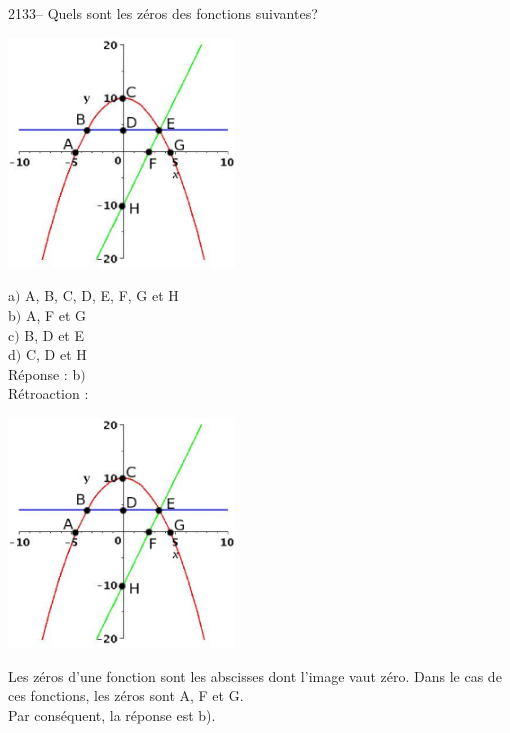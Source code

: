 \documentclass[letterpaper, 12pt]{article}
\begin{document}
2133--  Quels sont les z\'eros des fonctions suivantes?\\
\begin{center}
 \includegraphics[width=6cm,bb=14 14 415 415]{Q2133.eps}
\end{center}

a$)$ A, B, C, D, E, F, G et H\\
b$)$ A, F et G\\
c$)$ B, D et E\\
d$)$ C, D et H\\

R\'eponse : b$)$\\

R\'etroaction :\\
\begin{center}
 \includegraphics[width=6cm,bb=14 14 415 415]{Q2133.eps}
\end{center}
Les z\'eros d'une fonction sont les abscisses dont l'image vaut z\'ero. Dans le cas de ces fonctions, les z\'eros sont A, F et G.\\
Par cons\'equent, la r\'eponse est b).\\
\end{document}
